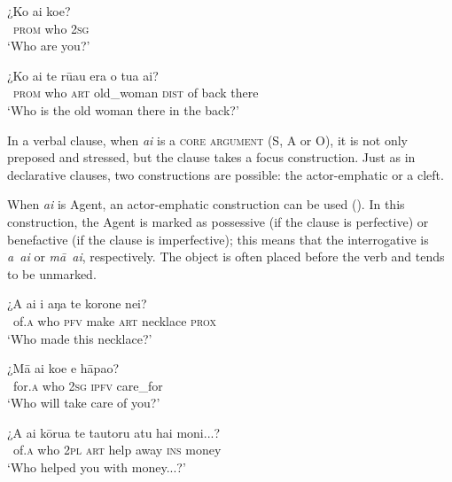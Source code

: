 \ea\label{ex:10.28}
\gll ¿Ko ai koe? \\
~\textsc{prom} who \textsc{2sg} \\

\glt 
‘Who are you?’ \textstyleExampleref{[R304.097]} 
\z

\ea\label{ex:10.29}
\gll ¿Ko ai te rū{\ꞌ}au era o tu{\ꞌ}a {\ꞌ}ai? \\
~\textsc{prom} who \textsc{art} old\_woman \textsc{dist} of back there \\

\glt 
‘Who is the old woman there in the back?’ \textstyleExampleref{[R416.1092]}
\z

In a verbal clause, when \textit{ai} is a \textsc{core argument} (S, A or O), it is not only preposed and stressed, but the clause takes a focus construction. Just as in declarative clauses, two constructions are possible: the actor-emphatic or a cleft.

When \textit{ai} is Agent, an actor-emphatic construction can be used (). In this construction, the Agent is marked as possessive (if the clause is perfective) or benefactive (if the clause is imperfective); this means that the interrogative is \textit{{\ꞌ}a~{\ꞌ}ai} or \textit{mā~{\ꞌ}ai}, respectively. The object is often placed before the verb and tends to be unmarked.

\ea\label{ex:10.30}
\gll ¿{\ꞌ}A {\ꞌ}ai i aŋa te korone nei? \\
~of\textsc{.a} who \textsc{pfv} make \textsc{art} necklace \textsc{prox} \\

\glt 
‘Who made this necklace?’ \textstyleExampleref{[R208.263]} 
\z

\ea\label{ex:10.31}
\gll ¿Mā {\ꞌ}ai koe e hāpa{\ꞌ}o? \\
~for\textsc{.a} who \textsc{2sg} \textsc{ipfv} care\_for \\

\glt 
‘Who will take care of you?’ \textstyleExampleref{[R438.011]} 
\z

\ea\label{ex:10.32}
\gll ¿{\ꞌ}A {\ꞌ}ai kōrua te tautoru atu hai moni...? \\
~of\textsc{.a} who \textsc{2pl} \textsc{art} help away \textsc{ins} money \\

\glt 
‘Who helped you with money...?’ \textstyleExampleref{[R621.024]} 
\z

